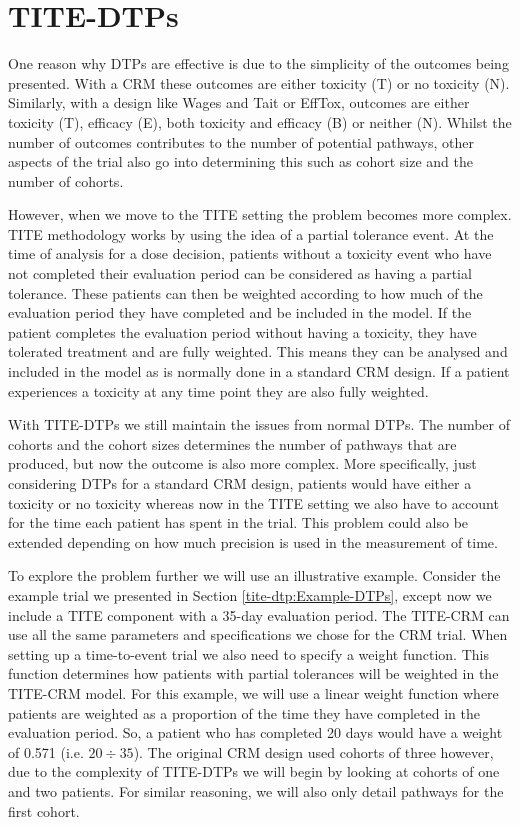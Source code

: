 \section{TITE-DTPs}
\label{tite-dtp:TITE-DTPs}

One reason why DTPs are effective is due to the simplicity of the outcomes being presented. With a CRM these outcomes are either toxicity (T) or no toxicity (N). Similarly, with a design like Wages and Tait or EffTox, outcomes are either toxicity (T), efficacy (E), both toxicity and efficacy (B) or neither (N). Whilst the number of outcomes contributes to the number of potential pathways, other aspects of the trial also go into determining this such as cohort size and the number of cohorts. 

However, when we move to the TITE setting the problem becomes more complex. TITE methodology works by using the idea of a partial tolerance event. At the time of analysis for a dose decision, patients without a toxicity event who have not completed their evaluation period can be considered as having a partial tolerance. These patients can then be weighted according to how much of the evaluation period they have completed and be included in the model. If the patient completes the evaluation period without having a toxicity, they have tolerated treatment and are fully weighted. This means they can be analysed and included in the model as is normally done in a standard CRM design. If a patient experiences a toxicity at any time point they are also fully weighted. 

With TITE-DTPs we still maintain the issues from normal DTPs. The number of cohorts and the cohort sizes determines the number of pathways that are produced, but now the outcome is also more complex. More specifically, just considering DTPs for a standard CRM design, patients would have either a toxicity or no toxicity whereas now in the TITE setting we also have to account for the time each patient has spent in the trial. This problem could also be extended depending on how much precision is used in the measurement of time. 

To explore the problem further we will use an illustrative example. Consider the example trial we presented in Section \ref{tite-dtp:Example-DTPs}, except now we include a TITE component with a 35-day evaluation period. The TITE-CRM can use all the same parameters and specifications we chose for the CRM trial. When setting up a time-to-event trial we also need to specify a weight function. This function determines how patients with partial tolerances will be weighted in the TITE-CRM model. For this example, we will use a linear weight function where patients are weighted as a proportion of the time they have completed in the evaluation period. So, a patient who has completed 20 days would have a weight of 0.571 (i.e. $20 \div 35$). The original CRM design used cohorts of three however, due to the complexity of TITE-DTPs we will begin by looking at cohorts of one and two patients. For similar reasoning, we will also only detail pathways for the first cohort. 

